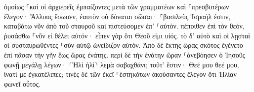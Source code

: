 \documentclass{openreader}
\begin{document}
ὁμοίως ⸀καὶ οἱ ἀρχιερεῖς ἐμπαίζοντες μετὰ τῶν γραμματέων καὶ ⸀πρεσβυτέρων ἔλεγον· 
Ἄλλους ἔσωσεν, ἑαυτὸν οὐ δύναται σῶσαι· ⸀βασιλεὺς Ἰσραήλ ἐστιν, καταβάτω νῦν ἀπὸ τοῦ σταυροῦ καὶ πιστεύσομεν ἐπ’ ⸀αὐτόν. 
πέποιθεν ἐπὶ τὸν θεόν, ῥυσάσθω ⸀νῦν εἰ θέλει αὐτόν· εἶπεν γὰρ ὅτι Θεοῦ εἰμι υἱός. 
τὸ δ’ αὐτὸ καὶ οἱ λῃσταὶ οἱ συσταυρωθέντες ⸀σὺν αὐτῷ ὠνείδιζον αὐτόν. 
Ἀπὸ δὲ ἕκτης ὥρας σκότος ἐγένετο ἐπὶ πᾶσαν τὴν γῆν ἕως ὥρας ἐνάτης. 
περὶ δὲ τὴν ἐνάτην ὥραν ⸀ἀνεβόησεν ὁ Ἰησοῦς φωνῇ μεγάλῃ λέγων· ⸂Ἠλὶ ἠλὶ⸃ λεμὰ σαβαχθάνι; τοῦτ’ ἔστιν· Θεέ μου θεέ μου, ἱνατί με ἐγκατέλιπες; 
τινὲς δὲ τῶν ἐκεῖ ⸀ἑστηκότων ἀκούσαντες ἔλεγον ὅτι Ἠλίαν φωνεῖ οὗτος. 
\end{document}
